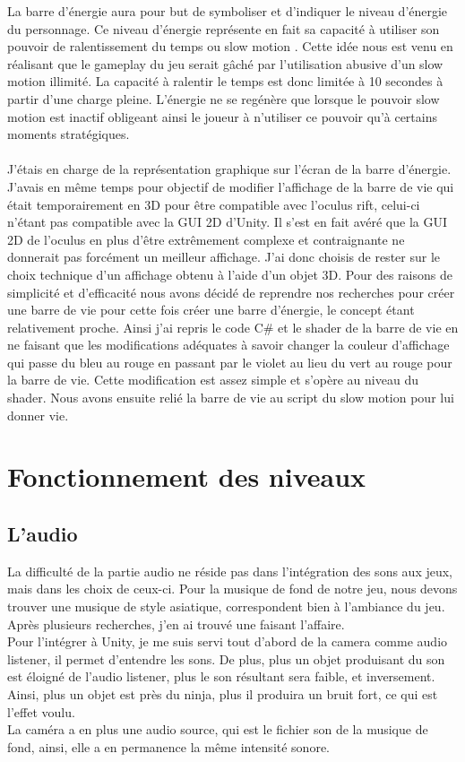 \documentclass[12pt]{article}
\begin{document}
La barre d’énergie aura pour but de symboliser et d’indiquer le niveau d’énergie du personnage. Ce niveau d’énergie représente en fait sa capacité à utiliser son pouvoir de ralentissement du temps ou  slow motion . Cette idée nous est venu en réalisant que le gameplay du jeu serait gâché par l’utilisation abusive d’un slow motion illimité. La capacité à ralentir le temps est donc limitée à 10 secondes à partir d’une charge pleine. L’énergie ne se regénère que lorsque le pouvoir slow motion est inactif obligeant ainsi le joueur à n’utiliser ce pouvoir qu’à certains moments stratégiques.\\ \\
J’étais en charge de la représentation graphique sur l’écran de la barre d’énergie. J’avais en même temps pour objectif de modifier l’affichage de la barre de vie qui était temporairement en 3D pour être compatible avec l’oculus rift, celui-ci n’étant pas compatible avec la GUI 2D d’Unity. Il s’est en fait avéré que la GUI 2D de l’oculus en plus d’être extrêmement complexe et contraignante ne donnerait pas forcément un meilleur affichage. J’ai donc choisis de rester sur le choix technique d’un affichage obtenu à l’aide d’un objet 3D. Pour des raisons de simplicité et d’efficacité nous avons décidé de reprendre nos recherches pour créer une barre de vie pour cette fois créer une barre d’énergie, le concept étant relativement proche. Ainsi j’ai repris le code C\# et le shader de la barre de vie en ne faisant que les modifications adéquates à savoir changer la couleur d’affichage qui passe du bleu au rouge en passant par le violet au lieu du vert au rouge pour la barre de vie. Cette modification est assez simple et s’opère au niveau du shader. Nous avons ensuite relié la barre de vie au script du slow motion pour lui donner vie.


\section{Fonctionnement des niveaux}

\subsection{L'audio}

La difficulté de la partie audio ne réside pas dans l'intégration des sons aux jeux, mais dans les choix de ceux-ci. Pour la musique de fond de notre jeu, nous devons trouver une musique de style asiatique, correspondent bien à l'ambiance du jeu. Après plusieurs recherches, j'en ai trouvé une faisant l'affaire.\\
Pour l'intégrer à Unity, je me suis servi tout d'abord de la camera comme audio listener, il permet d'entendre les sons. De plus, plus un objet produisant du son est éloigné de l'audio listener, plus le son résultant sera faible, et inversement. Ainsi, plus un objet est près du ninja, plus il produira un bruit fort, ce qui est l'effet voulu.\\
La caméra a en plus une audio source, qui est le fichier son de la musique de fond, ainsi, elle a en permanence la même intensité sonore.\\
\end{document}
